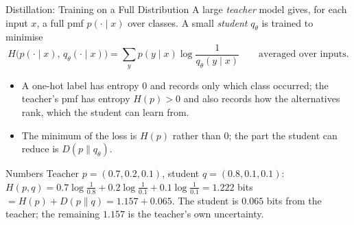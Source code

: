 \begin{frame}{Distillation: Training on a Full Distribution}
  \small
  A large \emph{teacher} model gives, for each input $x$, a full pmf $p(\cdot\mid x)$ over classes. A small \emph{student} $q_\theta$ is trained to minimise
  \[
    H\big(p(\cdot\mid x),\,q_\theta(\cdot\mid x)\big)=\sum_yp(y\mid x)\log\frac1{q_\theta(y\mid x)}\qquad\text{averaged over inputs}.
  \]
  \begin{itemize}
    \item A one-hot label has entropy $0$ and records only which class occurred; the teacher's pmf has entropy $H(p)>0$ and also records how the alternatives rank, which the student can learn from.
    \item The minimum of the loss is $H(p)$ rather than $0$; the part the student can reduce is $D(p\|q_\theta)$.
  \end{itemize}
  \begin{exampleblock}{Numbers}
    Teacher $p=(0.7,0.2,0.1)$, student $q=(0.8,0.1,0.1)$:
    $H(p,q)=0.7\log\tfrac1{0.8}+0.2\log\tfrac1{0.1}+0.1\log\tfrac1{0.1}=1.222$ bits $=H(p)+D(p\|q)=1.157+0.065$.
    The student is $0.065$ bits from the teacher; the remaining $1.157$ is the teacher's own uncertainty.
  \end{exampleblock}
\end{frame}

